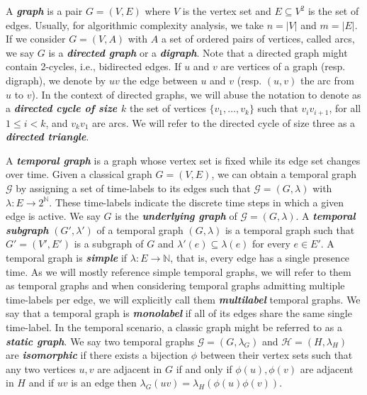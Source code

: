 \documentclass[runningheads]{llncs}
\newcommand{\bfit}[1]{\textbf{\textit{#1}}}
\begin{document}
A \bfit{graph} is a pair $G=(V,E)$ where $V$ is the vertex set and $E \subseteq V^2$ is the set of edges. Usually,  for algorithmic complexity analysis, we take $n=|V|$ and $m=|E|$. If we consider $G=(V,A)$ with $A$ a set of ordered pairs of vertices, called arcs, we say $G$ is a \bfit{directed graph} or a \bfit{digraph}. Note that a directed graph might contain 2-cycles, i.e., bidirected edges. If $u$ and $v$ are vertices of a graph (resp. digraph), we denote by $uv$ the edge between $u$ and $v$ (resp. $(u,v)$ the arc from $u$ to $v$). In the context of directed graphs, we will abuse the notation to denote as a \bfit{directed cycle of size $k$} the set of vertices $\{v_1, \dots, v_k\}$ such that $v_iv_{i+1}$,  for all $1\leq i < k$, and $v_kv_1$ are arcs.
We will refer to the directed cycle of size three as a \bfit{directed triangle}.

A \bfit{temporal graph} is a graph whose vertex set is fixed while its edge set changes over time. Given a classical graph $G=(V,E)$, we can obtain a temporal graph $\mathcal{G}$ by assigning a set of time-labels to its edges such that $\mathcal{G}=(G,\lambda)$ with $\lambda:E\rightarrow 2^{\mathds{N}}$. These time-labels indicate the discrete time steps in which a given edge is active. We say $G$ is the \bfit{underlying graph} of $\mathcal{G}=(G,\lambda)$. A \bfit{temporal subgraph} $(G',\lambda')$ of a temporal graph $(G,\lambda)$ is a temporal graph such that $G'=(V',E')$ is a subgraph of $G$ and $\lambda'(e) \subseteq \lambda(e)$ for every $e \in E'$. A temporal graph is \bfit{simple} if $\lambda: E\rightarrow \mathds{N}$, that is, every edge has a single presence time. As we will mostly reference simple temporal graphs, we will refer to them as temporal graphs and when considering temporal graphs admitting multiple time-labels per edge, we will explicitly call them \bfit{multilabel} temporal graphs. We say that a temporal graph is \bfit{monolabel} if all of its edges share the same single time-label. In the temporal scenario, a classic graph might be referred to as a \bfit{static graph}. We say two temporal graphs $\mathcal{G}=(G,\lambda_{G})$ and $\mathcal{H}=(H,\lambda_{H})$ are \bfit{isomorphic} if there exists a bijection $\phi$ between their vertex sets such that any two vertices $u,v$ are adjacent in $G$ if and only if $\phi(u), \phi(v)$ are adjacent in $H$ and if $uv $ is an edge then  $\lambda_G(uv) = \lambda_H(\phi(u)\phi(v))$.
\end{document}
